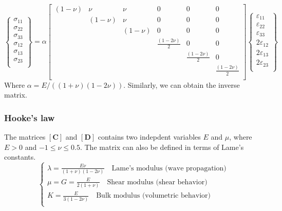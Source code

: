 \documentclass[notes]{beamer}
\begin{document}
\begin{frame}
\begin{equation*}
	\begin{Bmatrix}
		\sigma_{11}\\
		\sigma_{22}\\
		\sigma_{33}\\
		\sigma_{12}\\
		\sigma_{13}\\
		\sigma_{23}\\
	\end{Bmatrix} = \alpha
	\begin{bmatrix}
		(1-\nu) & \nu & \nu & 0 & 0 & 0 \\
	   			& (1-\nu) & \nu & 0 & 0 & 0 \\
	   			&  & (1-\nu) & 0 & 0 & 0 \\
	   			&  & & \frac{(1-2\nu)}{2} & 0 & 0 \\
	   			&  & & & \frac{(1-2\nu)}{2}  & 0 \\
	   			&  & & & & \frac{(1-2\nu)}{2} \\
	\end{bmatrix}
	\begin{Bmatrix}
		\varepsilon_{11}\\
		\varepsilon_{22}\\
		\varepsilon_{33}\\
		2\varepsilon_{12}\\
		2\varepsilon_{13}\\
		2\varepsilon_{23}\\
	\end{Bmatrix}
\end{equation*}
Where $\alpha = E / ((1+\nu)(1-2\nu))$.
Similarly, we can obtain the inverse matrix.
\end{frame}


\begin{frame}
\frametitle{Hooke's law}
The matrices $[\mathbf{C}]$ and $[\mathbf{D}]$ contains two indepdent variables $E$ and $\mu$, where $E > 0$ and $-1 \le \nu \le 0.5$. 
The matrix can also be defined in terms of Lame's constants.
\begin{equation*}
	\begin{cases}
		\lambda = \frac{E \nu}{(1+\nu)(1-2\nu)} \quad \text{Lame's modulus (wave propagation)}\\
		\mu = G = \frac{E}{2(1+\nu)}
		\quad \text{Shear modulus (shear behavior)}\\
		K = \frac{E}{3(1-2\nu)}
		\quad \text{Bulk modulus (volumetric behavior)}\\
	\end{cases}
\end{equation*}
\end{frame}
\end{document}
